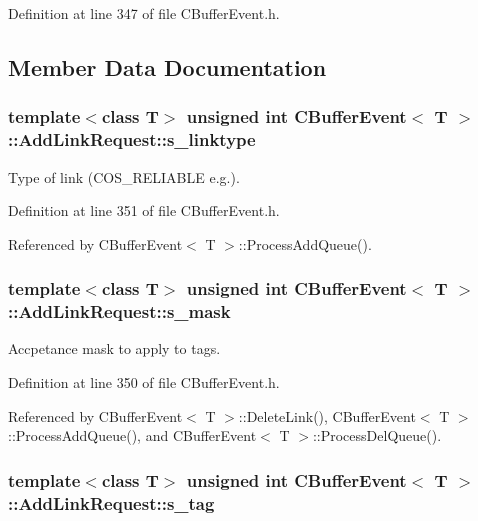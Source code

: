 Definition at line 347 of file CBuffer\-Event.h.

\subsection{Member Data Documentation}
\subsubsection{\setlength{\rightskip}{0pt plus 5cm}template$<$class T$>$ unsigned int {\bf CBuffer\-Event}$<$ T $>$::Add\-Link\-Request::s\_\-linktype}\label{structCBufferEvent_1_1AddLinkRequest_m3}


Type of link (COS\_\-RELIABLE e.g.).



Definition at line 351 of file CBuffer\-Event.h.

Referenced by CBuffer\-Event$<$ T $>$::Process\-Add\-Queue().
\subsubsection{\setlength{\rightskip}{0pt plus 5cm}template$<$class T$>$ unsigned int {\bf CBuffer\-Event}$<$ T $>$::Add\-Link\-Request::s\_\-mask}\label{structCBufferEvent_1_1AddLinkRequest_m2}


Accpetance mask to apply to tags.



Definition at line 350 of file CBuffer\-Event.h.

Referenced by CBuffer\-Event$<$ T $>$::Delete\-Link(), CBuffer\-Event$<$ T $>$::Process\-Add\-Queue(), and CBuffer\-Event$<$ T $>$::Process\-Del\-Queue().
\subsubsection{\setlength{\rightskip}{0pt plus 5cm}template$<$class T$>$ unsigned int {\bf CBuffer\-Event}$<$ T $>$::Add\-Link\-Request::s\_\-tag}\label{structCBufferEvent_1_1AddLinkRequest_m1}


